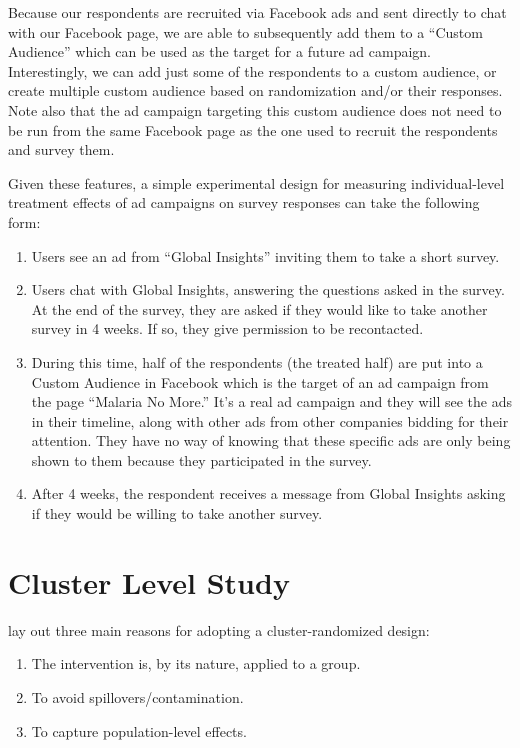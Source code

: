 \documentclass[a4paper,12pt]{article}
\begin{document}
Because our respondents are recruited via Facebook ads and sent directly to chat with our Facebook page, we are able to subsequently add them to a ``Custom Audience'' which can be used as the target for a future ad campaign. Interestingly, we can add just some of the respondents to a custom audience, or create multiple custom audience based on randomization and/or their responses. Note also that the ad campaign targeting this custom audience does not need to be run from the same Facebook page as the one used to recruit the respondents and survey them. 
 
Given these features, a simple experimental design for measuring individual-level treatment effects of ad campaigns on survey responses can take the following form: 

\begin{enumerate}
\item Users see an ad from ``Global Insights'' inviting them to take a short survey.
\item Users chat with Global Insights, answering the questions asked in the survey. At the end of the survey, they are asked if they would like to take another survey in 4 weeks. If so, they give permission to be recontacted.
\item During this time, half of the respondents (the treated half) are put into a Custom Audience in Facebook which is the target of an ad campaign from the page ``Malaria No More.'' It's a real ad campaign and they will see the ads in their timeline, along with other ads from other companies bidding for their attention. They have no way of knowing that these specific ads are only being shown to them because they participated in the survey. 
\item After 4 weeks, the respondent receives a message from Global Insights asking if they would be willing to take another survey. 
\end{enumerate}



\section{Cluster Level Study}

\cite{Hayes2017} lay out three main reasons for adopting a cluster-randomized design:

\begin{enumerate}
\item The intervention is, by its nature, applied to a group.
\item To avoid spillovers/contamination.
\item To capture population-level effects.
\end{enumerate}
\end{document}
